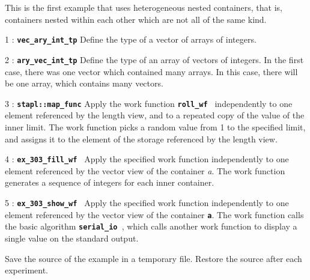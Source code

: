 \documentclass{report}
\begin{document}
This is the first example that uses heterogeneous nested containers, that is,
containers nested within each other which are not all of the same kind.

\begin{hashitemize}
\item 1 : \texttt{{\bf vec\_ary\_int\_tp}}
\newline
Define the type of a vector of arrays of integers.

\item 2 : \texttt{{\bf ary\_vec\_int\_tp}}
\newline
Define the type of an array of vectors of integers.  In the first case, there
was one vector which contained many arrays.  In this case, there will be
one array, which contains many vectors.

\item 3 : \texttt{{\bf stapl::map\_func}}
\newline
Apply the work function
\texttt{{\bf roll\_wf }}
independently to one element referenced by
the length view, and to a repeated copy of the value of the inner limit.
The work function picks a random value from 1 to the specified limit,
and assigns it to the element of the storage referenced by the length view.

\item 4 : \texttt{{\bf ex\_303\_fill\_wf }}
\newline
Apply the specified work function independently to one element referenced by
the vector view of the container \emph{a}.  The work function generates
a sequence of integers for each inner container.

\item 5 : \texttt{{\bf ex\_303\_show\_wf }}
\newline
Apply the specified work function independently to one element referenced by
the vector view of the container
\texttt{{\bf a}}.
The work function calls the basic algorithm
\texttt{{\bf serial\_io }},
which calls another work function to display a single value on the
standard output.

\end{hashitemize}

Save the source of the example in a temporary file.
Restore the source after each experiment.
\end{document}
